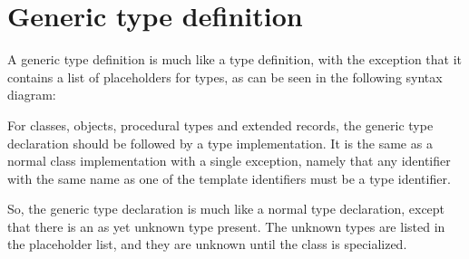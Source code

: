 \section{Generic type definition}
A generic type definition is much like a type definition, with the exception that it contains a list of placeholders for types, 
as can be seen in the following syntax diagram:

For classes, objects, procedural types and extended records, the generic 
type declaration should be followed by a type implementation.
It is the same as a normal class implementation with a single exception,
namely that any identifier with the same name as one of the template
identifiers must be a type identifier.

So, the generic type declaration is much like a normal type declaration, except that there is an as yet unknown type present.
The unknown types are listed in the placeholder list, and they are unknown until the class is specialized.

